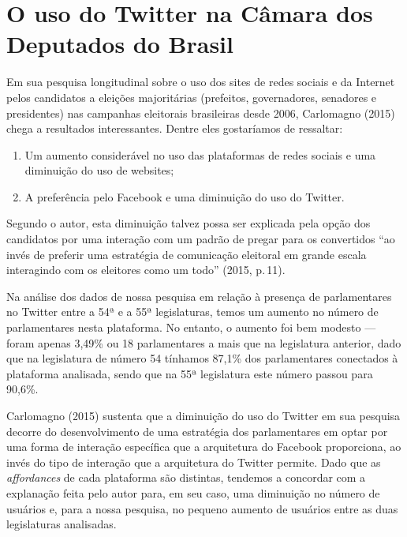 \section{O uso do Twitter na Câmara dos Deputados do Brasil}

Em sua pesquisa longitudinal sobre o uso dos sites de redes sociais e da
Internet pelos candidatos a eleições majoritárias (prefeitos,
governadores, senadores e presidentes) nas campanhas eleitorais
brasileiras desde 2006, Carlomagno (2015) chega a resultados
interessantes. Dentre eles gostaríamos de ressaltar: 

\begin{enumerate}

\item Um aumento
considerável no uso das plataformas de redes sociais e uma diminuição do
uso de websites; 

\item A preferência pelo Facebook e uma diminuição do
uso do Twitter. 
\end{enumerate}

Segundo o autor, esta diminuição talvez possa ser
explicada pela opção dos candidatos por uma interação com um padrão de
pregar para os convertidos ``ao invés de preferir uma estratégia de
comunicação eleitoral em grande escala interagindo com os eleitores como
um todo'' (2015, p.\,11).

Na análise dos dados de nossa pesquisa em relação à presença de
parlamentares no Twitter entre a 54ª e a 55ª legislaturas, temos um
aumento no número de parlamentares nesta plataforma. No entanto, o
aumento foi bem modesto --- foram apenas 3,49\% ou 18 parlamentares a mais
que na legislatura anterior, dado que na legislatura de número 54
tínhamos 87,1\% dos parlamentares conectados à plataforma analisada,
sendo que na 55ª legislatura este número passou para 90,6\%.

Carlomagno (2015) sustenta que a diminuição do uso do Twitter em sua
pesquisa decorre do desenvolvimento de uma estratégia dos parlamentares
em optar por uma forma de interação específica que a arquitetura do
Facebook proporciona, ao invés do tipo de interação que a arquitetura do
Twitter permite. Dado que as \textit{affordances} de cada plataforma são
distintas, tendemos a concordar com a explanação feita pelo autor para,
em seu caso, uma diminuição no número de usuários e, para a nossa
pesquisa, no pequeno aumento de usuários entre as duas legislaturas
analisadas. 


